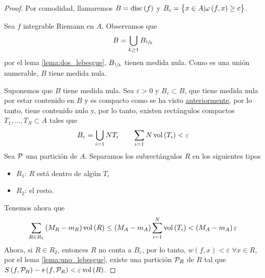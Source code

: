 \begin{proof}
    Por comodidad, llamaremos $B = \operatorname{disc}\left( f \right)$ y $B_c = \left\{x \in A
    \vert \omega\left( f, x \right) \geq c\right\}$.

    \bimplies

    Sea $f$ integrable Riemann en $A$. Observamos que
    \[
        B = \bigcup_{k \geq 1} B_{\sfrac{1}{k}}
    \]
    por el lema \ref{lema:dos_lebesgue}, $B_{\sfrac{1}{k}}$ tienen medida
    nula. Como es una unión numerable, $B$ tiene medida nula.

    \bimpliedby

    Suponemos que $B$ tiene medida nula. Sea $\varepsilon > 0$ y $B_\varepsilon
    \subset B$, que tiene medida nula por estar contenido en $B$ y es compacto 
    como se ha visto \hyperref[col:lebesgue]{anteriormente}, por lo tanto, tiene contenido nulo y, por lo
    tanto, existen rectángulos compactos $T_1, \dots, T_N \subset A$ tales que
    \[
        B_\varepsilon = \bigcup_{i = 1}{N} T_i \qquad
        \sum_{i=1}{N}\operatorname{vol}\left( T_i \right) < \varepsilon
    \]
    Sea $\mathcal{P}$ una partición de $A$. Separamos los subrectángulos $R$ en los
    siguientes tipos
    \begin{itemize}
        \item $R_1$: $R$ está dentro de algún $T_i$
        \item $R_2$: el resto.
    \end{itemize}

    Tenemos ahora que
    \[
        \sum_{R \in R_1}\left( M_R - m_R \right)\operatorname{vol}\left( R \right) \leq
        \left( M_A -m_A \right)\sum^{N}_{i=1} \operatorname{vol}\left( T_i \right) <
        \left( M_A - m_A \right) \varepsilon
    \]
    Ahora, si $R \in R_2$, entonces $R$ no conta a $B_\varepsilon$, por lo tanto,
    $w(f,x) < \varepsilon$ $\forall x \in R$, por el lema
    \ref{lema:uno_lebesgue}, existe una partición $\mathcal{P}_R$ de $R$ tal que
    $S\left( f, \mathcal{P}_R \right) - s\left( f, \mathcal{P}_R \right) < \varepsilon
    \operatorname{vol} \left( R \right)$.


\end{proof}
